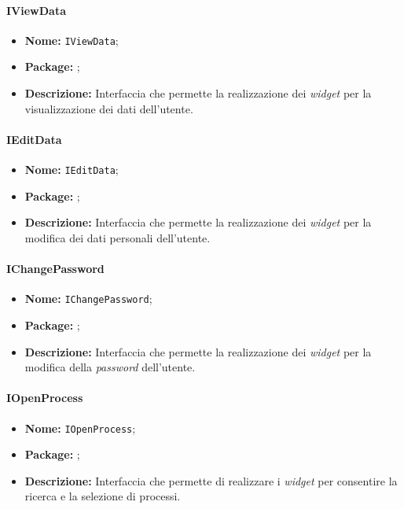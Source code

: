 \paragraph{IViewData}
\begin{itemize}
\item \textbf{Nome:} \texttt{IViewData};
\item \textbf{Package:} \texttt{\iViewUser{}};
\item \textbf{Descrizione:} Interfaccia che permette la realizzazione dei \textit{widget} per la visualizzazione dei dati dell'utente.
\end{itemize}

\paragraph{IEditData}
\begin{itemize}
\item \textbf{Nome:} \texttt{IEditData};
\item \textbf{Package:} \texttt{\iViewUser{}};
\item \textbf{Descrizione:} Interfaccia che permette la realizzazione dei \textit{widget} per la modifica dei dati personali dell'utente.
\end{itemize}

\paragraph{IChangePassword}
\begin{itemize}
\item \textbf{Nome:} \texttt{IChangePassword};
\item \textbf{Package:} \texttt{\iViewUser{}};
\item \textbf{Descrizione:} Interfaccia che permette la realizzazione dei \textit{widget} per la modifica della \textit{password} dell'utente.
\end{itemize}

\paragraph{IOpenProcess}
\begin{itemize}
\item \textbf{Nome:} \texttt{IOpenProcess};
\item \textbf{Package:} \texttt{\iViewUser{}};
\item \textbf{Descrizione:} Interfaccia che permette di realizzare i \textit{widget} per consentire la ricerca e la selezione di processi.
\end{itemize}

